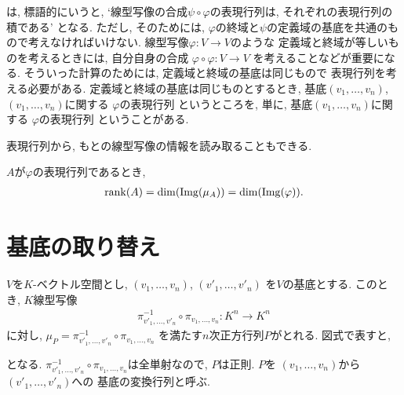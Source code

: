 \begin{remark}
  \label{rem:sqmat:samebasis}
  は,
  標語的にいうと,
  `線型写像の合成$\psi\circ\varphi$の表現行列は,
  それぞれの表現行列の積である'
  となる.
  ただし, そのためには,
  $\varphi$の終域と$\psi$の定義域の基底を共通のもので考えなければいけない.
  線型写像$\varphi\colon V\to V$のような
  定義域と終域が等しいものを考えるときには,
  自分自身の合成
  $\varphi\circ\varphi\colon V\to V$
  を考えることなどが重要になる.
  そういった計算のためには,
  定義域と終域の基底は同じもので
  表現行列を考える必要がある.
  定義域と終域の基底は同じものとするとき,
  基底$(v_1,\ldots,v_n)$, $(v_1,\ldots,v_n)$に関する
  $\varphi$の表現行列
  というところを,
  単に,
  基底$(v_1,\ldots,v_n)$に関する
  $\varphi$の表現行列
  ということがある.
\end{remark}

表現行列から, もとの線型写像の情報を読み取ることもできる.
\begin{prop}
  $A$が$\varphi$の表現行列であるとき,
  \begin{align*}
    \operatorname{rank}(A)=\dim(\operatorname{Img}(\mu_A))=\dim(\operatorname{Img}(\varphi)).
  \end{align*}
\end{prop}

\section{基底の取り替え}
$V$を$K$-ベクトル空間とし,
$(v_1,\ldots,v_n)$,
$(v'_1,\ldots,v'_n)$
を$V$の基底とする.
このとき, $K$線型写像
\begin{align*}
\pi_{v'_1,\ldots,v'_n}^{-1}\circ \pi_{v_1,\ldots,v_n}\colon K^n\to K^n
\end{align*}
に対し,
$\mu_{P}=\pi_{v'_1,\ldots,v'_n}^{-1}\circ \pi_{v_1,\ldots,v_n}$
を満たす$n$次正方行列$P$がとれる.
図式で表すと,
\begin{center}
\end{center}
となる.
$\pi_{v'_1,\ldots,v'_n}^{-1}\circ \pi_{v_1,\ldots,v_n}$は全単射なので,
$P$は正則.
$P$を
$(v_1,\ldots,v_n)$から
$(v'_1,\ldots,v'_n)$への
基底の変換行列と呼ぶ.


